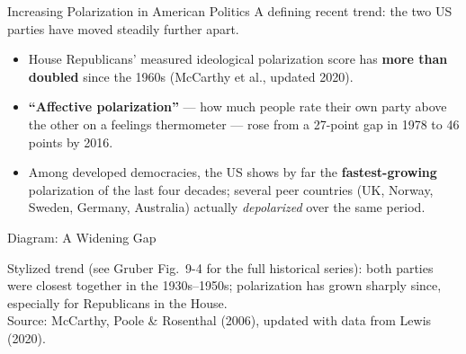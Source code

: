 \documentclass[11pt,aspectratio=169]{beamer}
\newcommand{\srcnote}[1]{{\footnotesize\color{wugray}Source: #1}}
\begin{document}
\begin{frame}{Increasing Polarization in American Politics}
  A defining recent trend: the two US parties have moved steadily further apart.
  \begin{itemize}
    \item House Republicans' measured ideological polarization score has \textbf{more than doubled} since the 1960s (McCarthy et al., updated 2020).
    \item \textbf{``Affective polarization''} --- how much people rate their own party above the other on a feelings thermometer --- rose from a 27-point gap in 1978 to 46 points by 2016.
    \item Among developed democracies, the US shows by far the \textbf{fastest-growing} polarization of the last four decades; several peer countries (UK, Norway, Sweden, Germany, Australia) actually \emph{depolarized} over the same period.
  \end{itemize}
\end{frame}

\begin{frame}{Diagram: A Widening Gap}
  \begin{center}
  \end{center}
  \footnotesize Stylized trend (see Gruber Fig.\ 9-4 for the full historical series): both parties were closest together in the 1930s--1950s; polarization has grown sharply since, especially for Republicans in the House.\\
  \srcnote{McCarthy, Poole \& Rosenthal (2006), updated with data from Lewis (2020).}
\end{frame}
\end{document}
